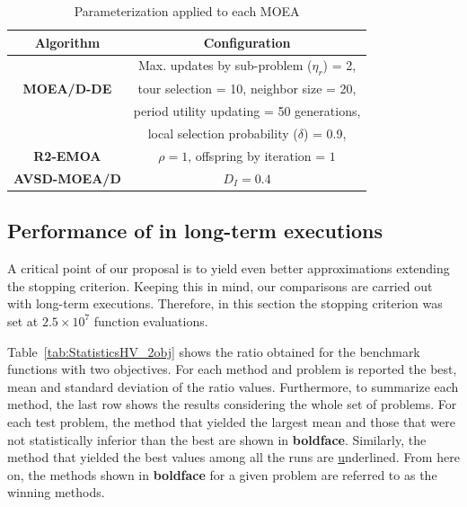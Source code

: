\begin{table}[t]
\centering
\caption{ Parameterization applied to each MOEA}
\label{tab:Parametrization}
\begin{tabular}{c|c}
\hline
\textbf{Algorithm} & \textbf{Configuration} \\ \hline
\multirow{3}{*}{
\textbf{MOEA/D-DE}} & Max. updates by sub-problem ($\eta_r$) = 2, \\
 & tour selection = 10,   neighbor size = 20, \\
 & period utility updating = 50 generations, \\
 & local selection probability ($\delta$) = 0.9,\\ \hline
\textbf{R2-EMOA} & $\rho=1$, offspring by iteration = $1$ \\ \hline
\textbf{AVSD-MOEA/D} & $D_I=0.4$ \\ \hline
\end{tabular}
\end{table}



\subsection{Performance of \MOEAS{} in long-term executions}


A critical point of our proposal is to yield even better approximations extending the stopping criterion.
%
Keeping this in mind, our comparisons are carried out with long-term executions.
%
Therefore, in this section the stopping criterion was set at $2.5 \times 10^7$ function evaluations.
%

%
Table~\ref{tab:StatisticsHV_2obj} shows the \HV{} ratio obtained for the benchmark functions with two objectives.
%
For each method and problem is reported the best, mean and standard deviation of the \HV{} ratio values.
%
Furthermore, to summarize each method, the last row shows the results considering the whole set of problems.
%
For each test problem, the method that yielded the largest mean and those that were not statistically inferior than the best are shown in \textbf{boldface}.
%
%
Similarly, the method that yielded the best \HV{} values among all the runs are {\ul underlined}.
%
From here on, the methods shown in {\bf boldface} for a given problem are referred to as the winning methods.
%

